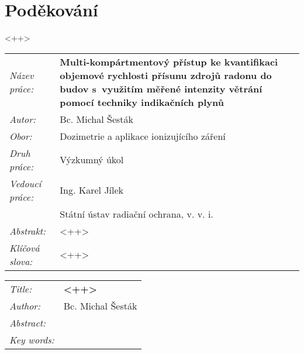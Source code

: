 \section*{Poděkování}
<++>
\newpage
\begin{tabularx}{\textwidth}{>{\itshape}l X}
  Název práce: & \textbf{Multi-kompártmentový přístup ke kvantifikaci  objemové rychlosti přísunu zdrojů radonu do budov s využitím měřené intenzity větrání pomocí techniky indikačních plynů}\\
  Autor: & Bc. Michal Šesták\\
  Obor: & Dozimetrie a aplikace ionizujícího záření\\
  Druh práce: & Výzkumný úkol\\
  Vedoucí práce: & Ing. Karel Jílek\\ 
               & Státní ústav radiační ochrana, v. v. i.\\
  Abstrakt: &  <++>\\
  Klíčová slova: & <++>
  \end{tabularx}
\newpage
\begin{tabularx}{\textwidth}{>{\itshape}l X}
  Title: & \textbf{<++>}\\
  Author: & Bc. Michal Šesták\\
  Abstract: & \\
  Key words: & 
\end{tabularx}
\newpage 
